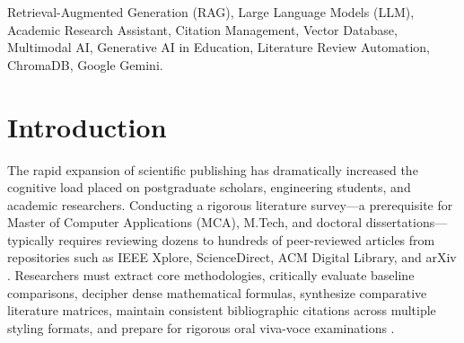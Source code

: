 \documentclass[conference]{IEEEtran}
\begin{document}
\begin{IEEEkeywords}
Retrieval-Augmented Generation (RAG), Large Language Models (LLM), Academic Research Assistant, Citation Management, Vector Database, Multimodal AI, Generative AI in Education, Literature Review Automation, ChromaDB, Google Gemini.
\end{IEEEkeywords}

\section{Introduction}
The rapid expansion of scientific publishing has dramatically increased the cognitive load placed on postgraduate scholars, engineering students, and academic researchers. Conducting a rigorous literature survey---a prerequisite for Master of Computer Applications (MCA), M.Tech, and doctoral dissertations---typically requires reviewing dozens to hundreds of peer-reviewed articles from repositories such as IEEE Xplore, ScienceDirect, ACM Digital Library, and arXiv \cite{alharbi2024}. Researchers must extract core methodologies, critically evaluate baseline comparisons, decipher dense mathematical formulas, synthesize comparative literature matrices, maintain consistent bibliographic citations across multiple styling formats, and prepare for rigorous oral viva-voce examinations \cite{ji2023, sharma2024}.
\end{document}
